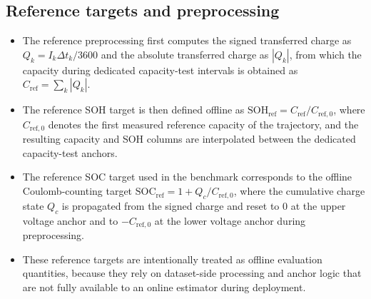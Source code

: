 \documentclass[review]{elsarticle}
\begin{document}
\subsection{Reference targets and preprocessing}
\begin{itemize}[leftmargin=*]
    \item The reference preprocessing first computes the signed transferred charge as $Q_k = I_k \Delta t_k / 3600$ and the absolute transferred charge as $|Q_k|$, from which the capacity during dedicated capacity-test intervals is obtained as $C_{\mathrm{ref}} = \sum_k |Q_k|$.
    \item The reference SOH target is then defined offline as $\mathrm{SOH}_{\mathrm{ref}} = C_{\mathrm{ref}} / C_{\mathrm{ref},0}$, where $C_{\mathrm{ref},0}$ denotes the first measured reference capacity of the trajectory, and the resulting capacity and SOH columns are interpolated between the dedicated capacity-test anchors.
    \item The reference SOC target used in the benchmark corresponds to the offline Coulomb-counting target $\mathrm{SOC}_{\mathrm{ref}} = 1 + Q_c / C_{\mathrm{ref},0}$, where the cumulative charge state $Q_c$ is propagated from the signed charge and reset to $0$ at the upper voltage anchor and to $-C_{\mathrm{ref},0}$ at the lower voltage anchor during preprocessing.
    \item These reference targets are intentionally treated as offline evaluation quantities, because they rely on dataset-side processing and anchor logic that are not fully available to an online estimator during deployment.
\end{itemize}
\end{document}
